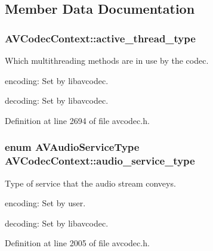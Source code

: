 \subsection{Member Data Documentation}
\subsubsection[{\texorpdfstring{active\+\_\+thread\+\_\+type}{active_thread_type}}]{ A\+V\+Codec\+Context\+::active\+\_\+thread\+\_\+type}\hypertarget{struct_a_v_codec_context_a5f4579d94675579e1d46a591340f598f}{}\label{struct_a_v_codec_context_a5f4579d94675579e1d46a591340f598f}
Which multithreading methods are in use by the codec.
\begin{DoxyItemize}
\item encoding\+: Set by libavcodec.
\item decoding\+: Set by libavcodec. 
\end{DoxyItemize}

Definition at line 2694 of file avcodec.\+h.

\subsubsection[{\texorpdfstring{audio\+\_\+service\+\_\+type}{audio_service_type}}]{\setlength{\rightskip}{0pt plus 5cm}enum {\bf A\+V\+Audio\+Service\+Type} A\+V\+Codec\+Context\+::audio\+\_\+service\+\_\+type}\hypertarget{struct_a_v_codec_context_a37e07891360937493c8ece702a09e0d6}{}\label{struct_a_v_codec_context_a37e07891360937493c8ece702a09e0d6}
Type of service that the audio stream conveys.
\begin{DoxyItemize}
\item encoding\+: Set by user.
\item decoding\+: Set by libavcodec. 
\end{DoxyItemize}

Definition at line 2005 of file avcodec.\+h.

